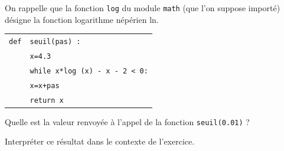\begin{enumerate}
On rappelle que la fonction \texttt{log} du module \texttt{math} (que l'on suppose importé)
désigne la fonction logarithme népérien ln.

\begin{center}
\begin{tabular}{|l l|} \hline
\texttt{def}& \texttt{seuil(pas) :}\\
&\texttt{x=4.3}\\
&\texttt{while x*log (x) - x - 2 < 0:}\\
&\quad \texttt{x=x+pas}\\
&\texttt{return x}\\ \hline
\end{tabular}
\end{center}

Quelle est la valeur renvoyée à l'appel de la fonction \texttt{seuil(0.01)} ?

Interpréter ce résultat dans le contexte de l'exercice.
\end{enumerate}

\bigskip
